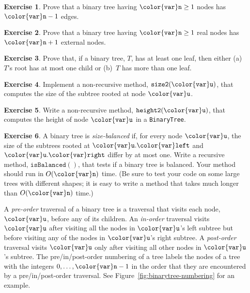 \documentclass[10pt]{book}
\newcommand{\figref}[1]{Figure~\ref{fig:#1}}
\theoremstyle{plain}
\theoremstyle{definition}
\newtheorem{exc}{Exercise}[chapter]
\begin{document}
\begin{exc}
  Prove that a binary tree having $\ensuremath{\mathtt{{\color{var}n}}}\ge 1$ nodes has $\ensuremath{\mathtt{{\color{var}n}}}-1$ edges.
\end{exc}

\begin{exc}
  Prove that a binary tree having $\ensuremath{\mathtt{{\color{var}n}}}\ge 1$ real nodes has $\ensuremath{\mathtt{{\color{var}n}}}+1$
  external nodes.
\end{exc}

\begin{exc}
  Prove that, if a binary tree, $T$, has at least one leaf, then either
  (a)~$T$'s root has at most one child or (b)~$T$ has more than
  one leaf.
\end{exc}

\begin{exc}
  Implement a non-recursive method, \ensuremath{\mathtt{size2({\color{var}u})}}, that computes the size
  of the subtree rooted at node \ensuremath{\mathtt{{\color{var}u}}}.
\end{exc}

\begin{exc}
  Write a non-recursive method, \ensuremath{\mathtt{height2({\color{var}u})}}, that computes the height
  of node \ensuremath{\mathtt{{\color{var}u}}} in a \texttt{BinaryTree}.
\end{exc}

\begin{exc}
  A binary tree is \emph{size-balanced}
  if, for every node \ensuremath{\mathtt{{\color{var}u}}}, the size of
  the subtrees rooted at \ensuremath{\mathtt{{\color{var}u}.{\color{var}left}}} and \ensuremath{\mathtt{{\color{var}u}.{\color{var}right}}} differ by at most one.
  Write a recursive method, \ensuremath{\mathtt{isBalanced()}}, that tests if a binary tree
  is balanced.  Your method should run in $O(\ensuremath{\mathtt{{\color{var}n}}})$ time.  (Be sure to
  test your code on some large trees with different shapes; it is easy
  to write a method that takes much longer than $O(\ensuremath{\mathtt{{\color{var}n}}})$ time.)
\end{exc}

%
%
%
%
%
%
A \emph{pre-order} traversal of a binary tree is a traversal that visits
each node, \ensuremath{\mathtt{{\color{var}u}}}, before any of its children.  An \emph{in-order} traversal
visits \ensuremath{\mathtt{{\color{var}u}}} after visiting all the nodes in \ensuremath{\mathtt{{\color{var}u}}}'s left subtree but before
visiting any of the nodes in \ensuremath{\mathtt{{\color{var}u}}}'s right subtree.  A \emph{post-order}
traversal visits \ensuremath{\mathtt{{\color{var}u}}} only after visiting all other nodes in \ensuremath{\mathtt{{\color{var}u}}}'s subtree.
The pre/in/post-order numbering of a tree labels the nodes of a tree with
the integers $0,\ldots,\ensuremath{\mathtt{{\color{var}n}}}-1$ in the order that they are encountered
by a pre/in/post-order traversal.  See \figref{binarytree-numbering}
for an example.
\end{document}
